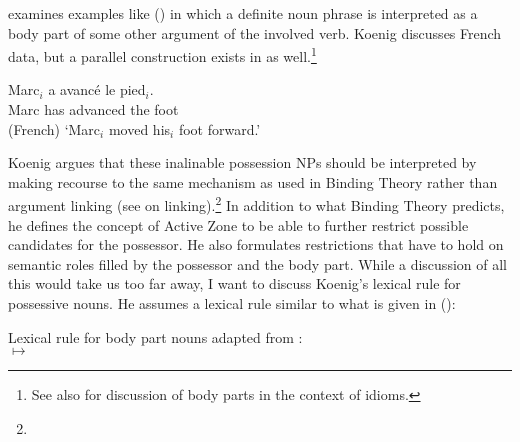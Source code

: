\documentclass[output=paper
 	        ,biblatex
                ,babelshorthands
                ,newtxmath
                ,draftmode
                ,colorlinks, citecolor=brown
]{langscibook}
\begin{document}
\citet{Koenig1999b} examines examples like () in which a definite noun phrase is interpreted
as a body part of some other argument of the involved verb. Koenig discusses French data, but a
parallel construction exists in  as well.\footnote{
See also \crossrefchapterw[\page \pageref{ex-herz-augen}]{idioms} for discussion of body parts in
the context of idioms.
}

\ea
\label{ex-marc-avance-le-pied}
\gll Marc$_i$ a avancé le pied$_i$.\\
     Marc     has advanced the foot\\\hfill{(French)}
\glt `Marc$_i$ moved his$_i$ foot forward.'
\z

Koenig argues that these inalinable possession NPs should be interpreted by making recourse to the
same mechanism as used in Binding Theory rather than argument linking (see
 on linking).\footnote{
} In addition to what Binding
Theory predicts, he defines the concept of Active Zone to be able to further restrict possible
candidates for the possessor. He also formulates restrictions that have to hold on semantic roles
filled by the possessor and the body part. While a discussion of all this would take us too far
away, I want to discuss Koenig's lexical rule for possessive nouns. He assumes a lexical rule
similar to what is given in ():

\vbox{
\ea
Lexical rule for body part nouns adapted from \citet[256]{Koenig1999b}:\\
 $\mapsto$\\
\flushright
{}
\z
}
\end{document}
